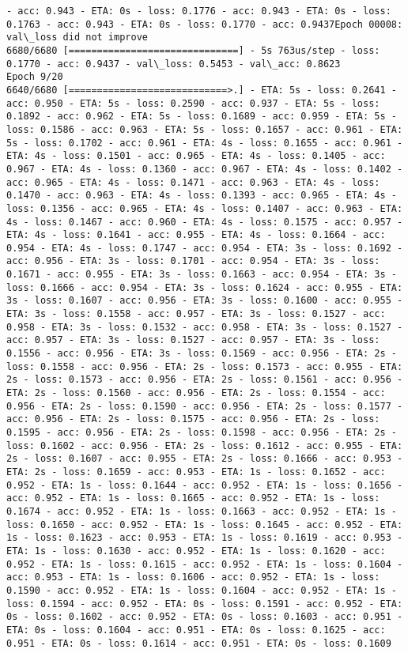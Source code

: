 \documentclass[11pt]{article}
\begin{document}
\begin{Verbatim}[commandchars=\\\{\}]
- acc: 0.943 - ETA: 0s - loss: 0.1776 - acc: 0.943 - ETA: 0s - loss: 0.1763 - acc: 0.943 - ETA: 0s - loss: 0.1770 - acc: 0.9437Epoch 00008: val\_loss did not improve
6680/6680 [==============================] - 5s 763us/step - loss: 0.1770 - acc: 0.9437 - val\_loss: 0.5453 - val\_acc: 0.8623
Epoch 9/20
6640/6680 [============================>.] - ETA: 5s - loss: 0.2641 - acc: 0.950 - ETA: 5s - loss: 0.2590 - acc: 0.937 - ETA: 5s - loss: 0.1892 - acc: 0.962 - ETA: 5s - loss: 0.1689 - acc: 0.959 - ETA: 5s - loss: 0.1586 - acc: 0.963 - ETA: 5s - loss: 0.1657 - acc: 0.961 - ETA: 5s - loss: 0.1702 - acc: 0.961 - ETA: 4s - loss: 0.1655 - acc: 0.961 - ETA: 4s - loss: 0.1501 - acc: 0.965 - ETA: 4s - loss: 0.1405 - acc: 0.967 - ETA: 4s - loss: 0.1360 - acc: 0.967 - ETA: 4s - loss: 0.1402 - acc: 0.965 - ETA: 4s - loss: 0.1471 - acc: 0.963 - ETA: 4s - loss: 0.1470 - acc: 0.963 - ETA: 4s - loss: 0.1393 - acc: 0.965 - ETA: 4s - loss: 0.1356 - acc: 0.965 - ETA: 4s - loss: 0.1407 - acc: 0.963 - ETA: 4s - loss: 0.1467 - acc: 0.960 - ETA: 4s - loss: 0.1575 - acc: 0.957 - ETA: 4s - loss: 0.1641 - acc: 0.955 - ETA: 4s - loss: 0.1664 - acc: 0.954 - ETA: 4s - loss: 0.1747 - acc: 0.954 - ETA: 3s - loss: 0.1692 - acc: 0.956 - ETA: 3s - loss: 0.1701 - acc: 0.954 - ETA: 3s - loss: 0.1671 - acc: 0.955 - ETA: 3s - loss: 0.1663 - acc: 0.954 - ETA: 3s - loss: 0.1666 - acc: 0.954 - ETA: 3s - loss: 0.1624 - acc: 0.955 - ETA: 3s - loss: 0.1607 - acc: 0.956 - ETA: 3s - loss: 0.1600 - acc: 0.955 - ETA: 3s - loss: 0.1558 - acc: 0.957 - ETA: 3s - loss: 0.1527 - acc: 0.958 - ETA: 3s - loss: 0.1532 - acc: 0.958 - ETA: 3s - loss: 0.1527 - acc: 0.957 - ETA: 3s - loss: 0.1527 - acc: 0.957 - ETA: 3s - loss: 0.1556 - acc: 0.956 - ETA: 3s - loss: 0.1569 - acc: 0.956 - ETA: 2s - loss: 0.1558 - acc: 0.956 - ETA: 2s - loss: 0.1573 - acc: 0.955 - ETA: 2s - loss: 0.1573 - acc: 0.956 - ETA: 2s - loss: 0.1561 - acc: 0.956 - ETA: 2s - loss: 0.1560 - acc: 0.956 - ETA: 2s - loss: 0.1554 - acc: 0.956 - ETA: 2s - loss: 0.1590 - acc: 0.956 - ETA: 2s - loss: 0.1577 - acc: 0.956 - ETA: 2s - loss: 0.1575 - acc: 0.956 - ETA: 2s - loss: 0.1595 - acc: 0.956 - ETA: 2s - loss: 0.1598 - acc: 0.956 - ETA: 2s - loss: 0.1602 - acc: 0.956 - ETA: 2s - loss: 0.1612 - acc: 0.955 - ETA: 2s - loss: 0.1607 - acc: 0.955 - ETA: 2s - loss: 0.1666 - acc: 0.953 - ETA: 2s - loss: 0.1659 - acc: 0.953 - ETA: 1s - loss: 0.1652 - acc: 0.952 - ETA: 1s - loss: 0.1644 - acc: 0.952 - ETA: 1s - loss: 0.1656 - acc: 0.952 - ETA: 1s - loss: 0.1665 - acc: 0.952 - ETA: 1s - loss: 0.1674 - acc: 0.952 - ETA: 1s - loss: 0.1663 - acc: 0.952 - ETA: 1s - loss: 0.1650 - acc: 0.952 - ETA: 1s - loss: 0.1645 - acc: 0.952 - ETA: 1s - loss: 0.1623 - acc: 0.953 - ETA: 1s - loss: 0.1619 - acc: 0.953 - ETA: 1s - loss: 0.1630 - acc: 0.952 - ETA: 1s - loss: 0.1620 - acc: 0.952 - ETA: 1s - loss: 0.1615 - acc: 0.952 - ETA: 1s - loss: 0.1604 - acc: 0.953 - ETA: 1s - loss: 0.1606 - acc: 0.952 - ETA: 1s - loss: 0.1590 - acc: 0.952 - ETA: 1s - loss: 0.1604 - acc: 0.952 - ETA: 1s - loss: 0.1594 - acc: 0.952 - ETA: 0s - loss: 0.1591 - acc: 0.952 - ETA: 0s - loss: 0.1602 - acc: 0.952 - ETA: 0s - loss: 0.1603 - acc: 0.951 - ETA: 0s - loss: 0.1604 - acc: 0.951 - ETA: 0s - loss: 0.1625 - acc: 0.951 - ETA: 0s - loss: 0.1614 - acc: 0.951 - ETA: 0s - loss: 0.1609 
\end{Verbatim}
\end{document}
